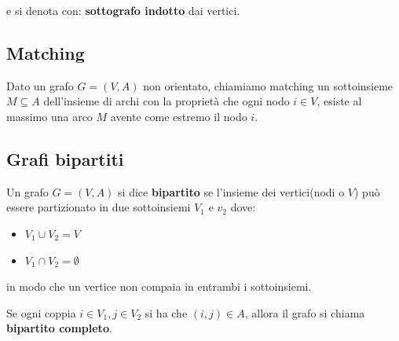 e si denota con: \textbf{sottografo indotto} dai vertici.

\subsection{Matching}
Dato un grafo $G = (V, A)$ non orientato, chiamiamo matching
un sottoinsieme $M \subseteq A$ dell'insieme di archi con la proprietà
che ogni nodo $i \in V$, esiste al massimo una arco $M$ avente come estremo il nodo $i$.

\subsection{Grafi bipartiti}
Un grafo $G = (V, A)$ si dice \textbf{bipartito} se l'insieme dei vertici(nodi o $V$)
può essere partizionato in due sottoinsiemi $V_1$ e $v_2$ dove:
\begin{itemize}
    \item $V_1 \cup V_2 = V$
    \item $V_1 \cap V_2 = \emptyset$
\end{itemize}

in modo che un vertice non compaia in entrambi i sottoinsiemi.

Se ogni coppia $i \in V_1, j \in V_2$ si ha che $(i, j) \in A$, allora il grafo si chiama \textbf{bipartito completo}.


